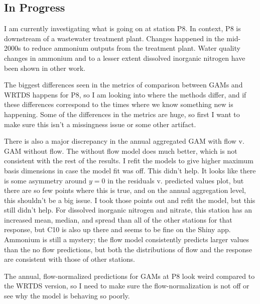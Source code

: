 \documentclass[12pt]{amsart}
\begin{document}
\subsection{In Progress}

I am currently investigating what is going on at station P8. In context, P8 is downstream of a wastewater treatment plant. Changes happened in the mid-2000s to reduce ammonium outputs from the treatment plant. Water quality changes in ammonium and to a lesser extent dissolved inorganic nitrogen have been shown in other work.

The biggest differences seen in the metrics of comparison between GAMs and WRTDS happens for P8, so I am looking into where the methods differ, and if these differences correspond to the times where we know something new is happening. Some of the differences in the metrics are huge, so first I want to make sure this isn't a missingness issue or some other artifact. 

There is also a major discrepancy in the annual aggregated GAM with flow v. GAM without flow. The without flow model does much better, which is not consistent with the rest of the results. I refit the models to give higher maximum basis dimensions in case the model fit was off. This didn't help. It looks like there is some asymmetry around $y=0$ in the residuals v. predicted values plot, but there are so few points where this is true, and on the annual aggregation level, this shouldn't be a big issue. I took those points out and refit the model, but this still didn't help. For dissolved inorganic nitrogen and nitrate, this station has an increased mean, median, and spread than all of the other stations for that response, but C10 is also up there and seems to be fine on the Shiny app. Ammonium is still a mystery; the flow model consistently predicts larger values than the no flow predictions, but both the distributions of flow and the response are consistent with those of other stations.

The annual, flow-normalized predictions for GAMs at P8 look weird compared to the WRTDS version, so I need to make sure the flow-normalization is not off or see why the model is behaving so poorly.
\end{document}

